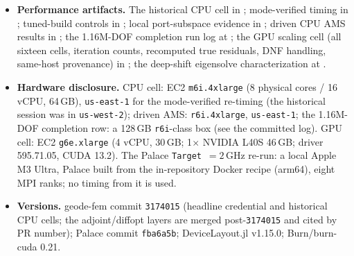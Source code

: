 \documentclass{anvil-paper}
\begin{document}
\begin{itemize}
    extrapolation rule for $L_s$, the loop-corrected anchor, its verdicts
    and the offset decomposition in
     (example
    \texttt{transmon\_loop\_inductance}; Palace cells under
    ). The
    three anchors are \texttt{TransmonAnchor::devicelayout},
    \texttt{devicelayout\_bare} and \texttt{devicelayout\_bare\_loop} in
    ; tests in
     pin both
    artifacts.
  \item \textbf{Performance artifacts.} The historical CPU cell in
    ; mode-verified
    timing in
    ;
    tuned-build controls in
    ;
    local port-subspace evidence in
    ;
    driven CPU AMS results in
    ; the 1.16M-DOF
    completion run log at
    ;
    the GPU scaling cell (all sixteen cells, iteration counts,
    recomputed true residuals, DNF handling, same-host provenance) in
    ; the deep-shift
    eigensolve characterization at
    .
  \item \textbf{Hardware disclosure.} CPU cell: EC2 \texttt{m6i.4xlarge}
    (8 physical cores / 16 vCPU, 64\,GB), \texttt{us-east-1} for the
    mode-verified re-timing (the historical session was in
    \texttt{us-west-2}); driven AMS: \texttt{r6i.4xlarge},
    \texttt{us-east-1}; the
    1.16M-DOF completion row: a 128\,GB \texttt{r6i}-class box (see the
    committed log). GPU cell: EC2 \texttt{g6e.xlarge} (4 vCPU, 30\,GB;
    1$\times$ NVIDIA L40S 46\,GB; driver 595.71.05, CUDA 13.2). The
    Palace \texttt{Target}~$= 2$\,GHz re-run: a local Apple M3 Ultra,
    Palace built from the in-repository Docker recipe (arm64), eight MPI
    ranks; no timing from it is used.
  \item \textbf{Versions.} geode-fem commit \texttt{3174015} (headline
    credential and historical CPU cells; the adjoint/diffopt layers are merged
    post-\texttt{3174015} and cited by PR number); Palace commit
    \texttt{fba6a5b}; DeviceLayout.jl v1.15.0; Burn/burn-cuda 0.21.
\end{itemize}
\end{document}
